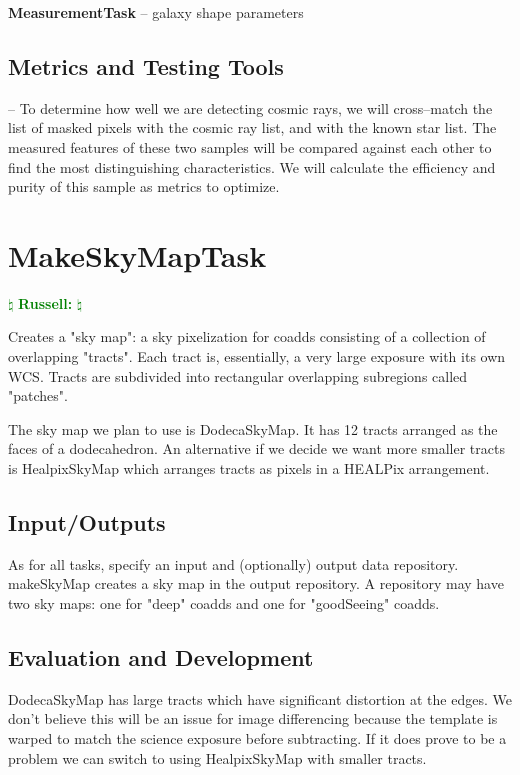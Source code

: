 \documentclass[prd, nofootinbib, floatfix, 11pt,tightenlines,times]{article}
\newcommand{\russ} { \textcolor{green} {
\ensuremath{\natural} {\bf Russell:}  
\ensuremath{\natural} } }
\begin{document}
{\bf MeasurementTask}
-- galaxy shape parameters

\subsection{Metrics and Testing Tools}

-- To determine how well we are detecting cosmic rays, we will
cross--match the list of masked pixels with the cosmic ray list, and
with the known star list.  The measured features of these two samples
will be compared against each other to find the most distinguishing
characteristics.  We will calculate the efficiency and purity of this
sample as metrics to optimize.


\clearpage 
\section{MakeSkyMapTask} \russ

Creates a "sky map": a sky pixelization for coadds consisting of a collection of overlapping "tracts".
Each tract is, essentially, a very large exposure with its own WCS.
Tracts are subdivided into rectangular overlapping subregions called "patches".

The sky map we plan to use is DodecaSkyMap. It has 12 tracts arranged as the faces of a dodecahedron.
An alternative if we decide we want more smaller tracts is HealpixSkyMap which arranges
tracts as pixels in a HEALPix arrangement.

\subsection{Input/Outputs}

As for all tasks, specify an input and (optionally) output data repository.
makeSkyMap creates a sky map in the output repository.
A repository may have two sky maps: one for "deep" coadds and one for "goodSeeing" coadds.

\subsection{Evaluation and Development}

DodecaSkyMap has large tracts which have significant distortion at the edges.
We don't believe this will be an issue for image differencing because the template is warped
to match the science exposure before subtracting. If it does prove to be a problem
we can switch to using HealpixSkyMap with smaller tracts.
\end{document}
